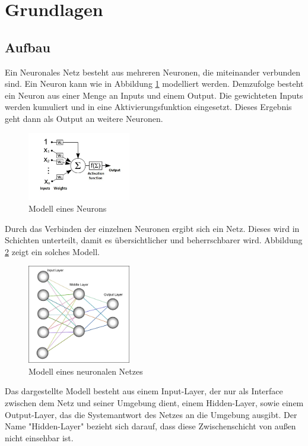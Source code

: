 \section{Grundlagen}

\subsection{Aufbau}
Ein Neuronales Netz besteht aus mehreren Neuronen, die miteinander verbunden sind. Ein Neuron kann wie in Abbildung \ref{neuron} modelliert werden. Demzufolge besteht ein Neuron aus einer Menge an Inputs und einem Output. Die gewichteten Inputs werden kumuliert und in eine Aktivierungsfunktion eingesetzt. Dieses Ergebnis geht dann als Output an weitere Neuronen. 
\begin{figure}[h]
\centering
\includegraphics[width=0.4\textwidth]{pictures/neuron.jpg}
\caption{Modell eines Neurons \cite{bib:neuron}}
\label{neuron}
\end{figure}

Durch das Verbinden der einzelnen Neuronen ergibt sich ein Netz. Dieses wird in Schichten unterteilt, damit es übersichtlicher und beherrschbarer wird. Abbildung \ref{network} zeigt ein solches Modell.
\begin{figure}[h]
\centering
\includegraphics[width=0.4\textwidth]{pictures/neural-network.png}
\caption{Modell eines neuronalen Netzes \cite{bib:neuron}}
\label{network}
\end{figure}

Das dargestellte Modell besteht aus einem Input-Layer, der nur als Interface zwischen dem Netz und seiner Umgebung dient, einem Hidden-Layer, sowie einem Output-Layer, das die Systemantwort des Netzes an die Umgebung ausgibt. Der Name "Hidden-Layer" bezieht sich darauf, dass diese Zwischenschicht von außen nicht einsehbar ist.

